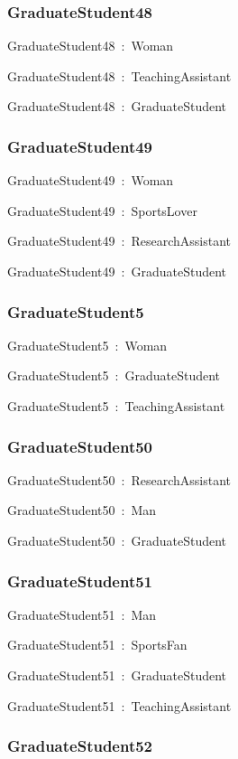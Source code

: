 \documentclass{article}
\begin{document}
\subsubsection*{GraduateStudent48}

GraduateStudent48~:~Woman

GraduateStudent48~:~TeachingAssistant

GraduateStudent48~:~GraduateStudent

\subsubsection*{GraduateStudent49}

GraduateStudent49~:~Woman

GraduateStudent49~:~SportsLover

GraduateStudent49~:~ResearchAssistant

GraduateStudent49~:~GraduateStudent

\subsubsection*{GraduateStudent5}

GraduateStudent5~:~Woman

GraduateStudent5~:~GraduateStudent

GraduateStudent5~:~TeachingAssistant

\subsubsection*{GraduateStudent50}

GraduateStudent50~:~ResearchAssistant

GraduateStudent50~:~Man

GraduateStudent50~:~GraduateStudent

\subsubsection*{GraduateStudent51}

GraduateStudent51~:~Man

GraduateStudent51~:~SportsFan

GraduateStudent51~:~GraduateStudent

GraduateStudent51~:~TeachingAssistant

\subsubsection*{GraduateStudent52}
\end{document}
